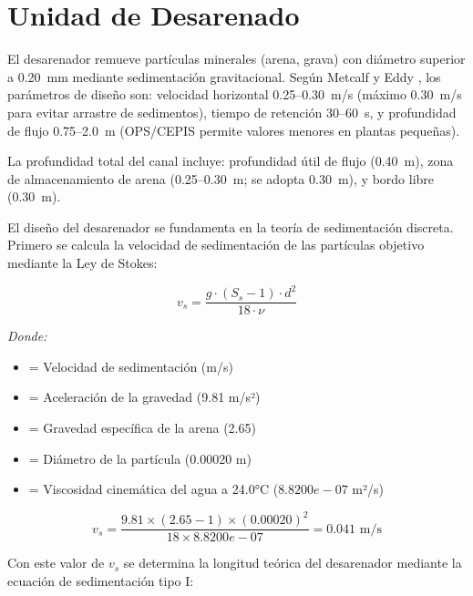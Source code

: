 \documentclass[12pt,a4paper]{article}
\newcommand{\captionequation}[1]{}  %
\begin{document}
\section{Unidad de Desarenado}



El desarenador remueve part\'iculas minerales (arena, grava) con di\'ametro superior a 0.20~mm mediante sedimentaci\'on gravitacional. Seg\'un Metcalf y Eddy \cite{metcalf2014}, los par\'ametros de dise\~no son: velocidad horizontal 0.25--0.30~m/s (m\'aximo 0.30~m/s para evitar arrastre de sedimentos), tiempo de retenci\'on 30--60~s, y profundidad de flujo 0.75--2.0~m (OPS/CEPIS \cite{ops2005} permite valores menores en plantas peque\~nas).

La profundidad total del canal incluye: profundidad \'util de flujo (0.40~m), zona de almacenamiento de arena (0.25--0.30~m; se adopta 0.30~m), y bordo libre (0.30~m).

El dise\~no del desarenador se fundamenta en la teor\'ia de sedimentaci\'on discreta. Primero se calcula la velocidad de sedimentaci\'on de las part\'iculas objetivo mediante la Ley de Stokes:

\begin{equation}
v_s = \frac{g \cdot (S_s - 1) \cdot d^2}{18 \cdot \nu}
\end{equation}
\captionequation{Ley de Stokes - Velocidad de sedimentacion de particulas}

\textit{Donde:}
\begin{itemize}[noitemsep,leftmargin=2em]
    \item[$v_s$] = Velocidad de sedimentaci\'on (m/s)
    \item[$g$] = Aceleraci\'on de la gravedad (9.81 m/s²)
    \item[$S_s$] = Gravedad espec\'ifica de la arena (2.65)
    \item[$d$] = Di\'ametro de la part\'icula (0.00020 m)
    \item[$\nu$] = Viscosidad cinem\'atica del agua a 24.0°C ($8.8200e-07$ m²/s)
\end{itemize}

\begin{equation}
v_s = \frac{9.81 \times (2.65 - 1) \times (0.00020)^2}{18 \times 8.8200e-07} = 0.041 \text{ m/s}
\end{equation}

Con este valor de $v_s$ se determina la longitud te\'orica del desarenador mediante la ecuaci\'on de sedimentaci\'on tipo I:
\end{document}
